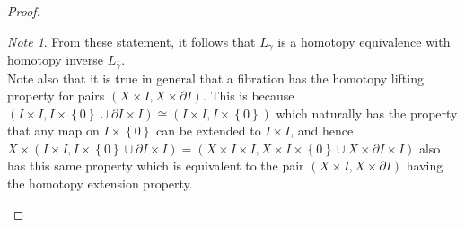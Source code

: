 \documentclass[reqno]{amsart}
\theoremstyle{definition}
\theoremstyle{remark}
\newtheorem*{note}{Note}
\begin{document}
\begin{proof}
         \begin{note}
             From these statement, it follows that
             $L_{\gamma}$ is a homotopy equivalence
             with homotopy inverse $L_{\overline{\gamma}}$.\\
             Note also that it is true in general that
             a fibration has the homotopy lifting 
             property for pairs $\left( X \times I,
             X \times \partial I\right) $. This is
             because 
             $\left( I \times I, I \times \left\{ 0 \right\} 
             \cup  \partial I \times I \right) 
             \cong \left( I \times I,
             I \times \left\{ 0 \right\} \right)  $ which
             naturally has the property
             that any map on
             $I \times \left\{ 0 \right\} $ can
             be extended to $I \times I$, and hence 
             $X \times \left( I \times I,
             I \times \left\{ 0 \right\} \cup 
         \partial I \times I \right) =
         \left( X \times I \times I,
         X \times I \times \left\{ 0 \right\} \cup 
     X \times \partial I \times I \right) $ also has this
     same property which is equivalent to the pair
     $\left( X \times I, X \times \partial I \right) $ having
     the homotopy extension property.
         \end{note}


\end{proof}
\end{document}
